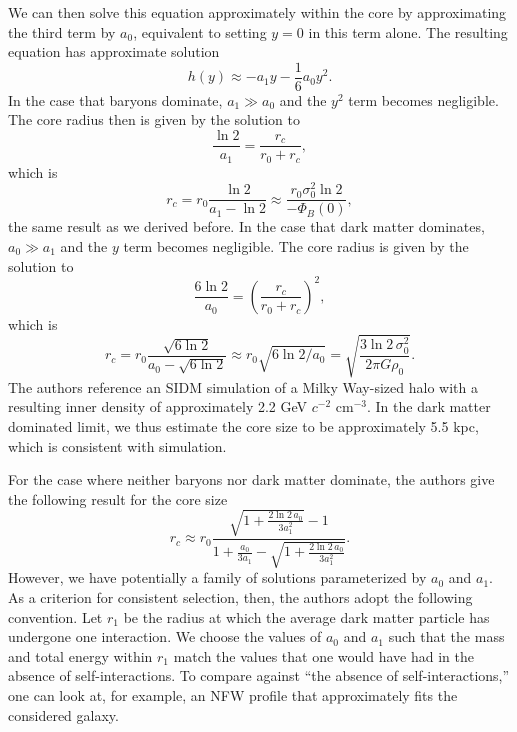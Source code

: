We can then solve this equation approximately within the core by approximating
the third term by $a_0$, equivalent to setting $y = 0$ in this term alone. The
resulting equation has approximate solution 
\begin{equation}
    h(y) \approx -a_1 y - \frac{1}{6} a_0 y^2.
\end{equation}
In the case that baryons dominate, $a_1 \gg a_0$ and the $y^2$ term becomes
negligible. The core radius then is given by the solution to 
\begin{equation}
    \frac{\ln 2}{a_1} = \frac{r_c}{r_0 + r_c},
\end{equation}
which is 
\begin{equation}
    r_c = r_0 \frac{\ln 2}{a_1 - \ln 2} \approx 
    \frac{r_0 \sigma_0^2 \ln 2}{-\Phi_B(0)},
\end{equation}
the same result as we derived before. In the case that dark matter dominates,
$a_0 \gg a_1$ and the $y$ term becomes negligible. The core radius is given by
the solution to 
\begin{equation}
    \frac{6 \ln 2}{a_0} = \left(\frac{r_c}{r_0 + r_c}\right)^2,
\end{equation}
which is 
\begin{equation} \label{eq:core_dm_dom}
    r_c = r_0 \frac{\sqrt{6\ln 2}}{a_0 - \sqrt{6\ln 2}} \approx 
    r_0 \sqrt{6 \ln 2 / a_0} = \sqrt{\frac{3 \ln 2\, \sigma_0^2}{2 \pi G \rho_0}}.
\end{equation}
The authors reference an SIDM simulation of a Milky Way-sized halo with a
resulting inner density of approximately 2.2 GeV $c^{-2}$ cm$^{-3}$. In the dark
matter dominated limit, we thus estimate the core size to be approximately 5.5
kpc, which is consistent with simulation. 

For the case where neither baryons nor dark matter dominate, the authors give
the following result for the core size
\begin{equation} \label{eq:core_size}
    r_c \approx r_0 \frac{\sqrt{1 + \frac{2 \ln 2\, a_0}{3 a_1^2}} - 1}{
        1 + \frac{a_0}{3 a_1} - \sqrt{1 + \frac{2 \ln 2\, a_0}{3 a_1^2}} 
    }.
\end{equation}
However, we have potentially a family of solutions parameterized by $a_0$ and
$a_1$. As a criterion for consistent selection, then, the authors adopt the
following convention. Let $r_1$ be the radius at which the average dark matter
particle has undergone one interaction. We choose the values of $a_0$ and
$a_1$ such that the mass and total energy within $r_1$ match the values that
one would have had in the absence of self-interactions. To compare against
``the absence of self-interactions,'' one can look at, for example, an NFW
profile that approximately fits the considered galaxy.

